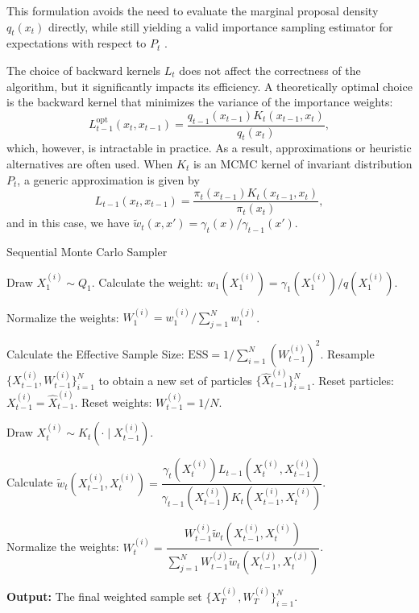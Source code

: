 \documentclass[a4paper, 12pt]{article}
\begin{document}
    This formulation avoids the need to evaluate the marginal proposal density $q_t(x_t)$ directly, while still yielding a valid importance sampling estimator for expectations with respect to $P_t$ \citep{DelMoral2006}.

    The choice of backward kernels $L_t$ does not affect the correctness of the algorithm, but it significantly impacts its efficiency. A theoretically optimal choice is the backward kernel that minimizes the variance of the importance weights:
    \[
        L_{t-1}^{\text{opt}}(x_{t}, x_{t-1}) = \frac{q_{t-1}(x_{t-1}) K_{t}(x_{t-1}, x_{t})}{q_{t}(x_{t})},
    \]
    which, however, is intractable in practice. As a result, approximations or heuristic alternatives are often used. When $K_t$ is an MCMC kernel of invariant distribution $P_t$, a generic approximation is given by
    \[
        L_{t-1}(x_t, x_{t-1}) = \dfrac{\pi_t(x_{t-1}) K_t(x_{t-1}, x_t)}{\pi_t(x_t)},
    \]
    and in this case, we have $\tilde{w}_t(x, x') = \gamma_t(x)/\gamma_{t-1}(x')$.

    \begin{algorithm}
    \caption{Sequential Monte Carlo Sampler}
    \begin{algorithmic}[1]
        \State Draw $X_1^{(i)} \sim Q_1$.
        \State Calculate the weight: $w_1(X_1^{(i)}) = \gamma_1(X_1^{(i)})/q(X_1^{(i)})$.
    \EndFor

    \State Normalize the weights: $W_1^{(i)} = w_1^{(i)} / \sum_{j=1}^N w_1^{(j)}$. 
    

        \State Calculate the Effective Sample Size: $\text{ESS} = 1 / \sum_{i=1}^N (W_{t-1}^{(i)})^2$.
            \State Resample $\{X_{t-1}^{(i)}, W_{t-1}^{(i)}\}_{i=1}^N$ to obtain a new set of particles $\{\hat{X}_{t-1}^{(i)}\}_{i=1}^N$.
            \State Reset particles: $X_{t-1}^{(i)} = \hat{X}_{t-1}^{(i)}$.
            \State Reset weights: $W_{t-1}^{(i)} = 1/N$.
        \EndIf

            \State Draw $X_t^{(i)} \sim K_t(\cdot \mid X_{t-1}^{(i)})$.

            \State Calculate $\tilde{w}_t(X_{t-1}^{(i)}, X_t^{(i)}) = \dfrac{\gamma_t(X_t^{(i)}) L_{t-1}(X_t^{(i)}, X_{t-1}^{(i)})}{\gamma_{t-1}(X_{t-1}^{(i)})K_t(X_{t-1}^{(i)}, X_t^{(i)})}$.
        \EndFor

        \State Normalize the weights: $W_t^{(i)} = \dfrac{W_{t-1}^{(i)} \tilde{w}_t(X_{t-1}^{(i)}, X_t^{(i)})}{\sum_{j=1}^N W_{t-1}^{(j)} \tilde{w}_t(X_{t-1}^{(j)}, X_t^{(j)})}$.
        
        
        
    \EndFor
    \State \textbf{Output:} The final weighted sample set $\{X_T^{(i)}, W_T^{(i)}\}_{i=1}^N$.
    \end{algorithmic}
    \end{algorithm}
\end{document}
